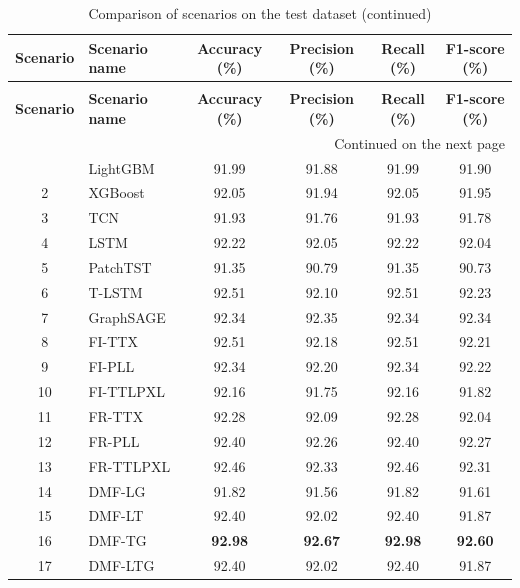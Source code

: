 \documentclass[10pt,twoside]{article}
\newcommand{\fairsmallfont}{\fontsize{9pt}{11pt}\selectfont}
\begin{document}
\begingroup
\centering
\setlength{\tabcolsep}{4pt}
\renewcommand{\arraystretch}{1.05}
\begin{longtable}{c l c c c c}
\caption{Comparison of scenarios on the test dataset}
\label{tab:test_scenarios_comparison}\\
\hline
\textbf{Scenario} & \textbf{Scenario name} & \textbf{Accuracy (\%)} & \textbf{Precision (\%)} & \textbf{Recall (\%)} & \textbf{F1-score (\%)} \\
\hline
\endfirsthead
\caption[]{Comparison of scenarios on the test dataset (continued)}\\
\hline
\textbf{Scenario} & \textbf{Scenario name} & \textbf{Accuracy (\%)} & \textbf{Precision (\%)} & \textbf{Recall (\%)} & \textbf{F1-score (\%)} \\
\hline
\endhead
\hline
\multicolumn{6}{r}{\fairsmallfont Continued on the next page}\\
\endfoot
\hline
\endlastfoot
1  & LightGBM   & 91.99 & 91.88 & 91.99 & 91.90 \\
2  & XGBoost    & 92.05 & 91.94 & 92.05 & 91.95 \\
3  & TCN        & 91.93 & 91.76 & 91.93 & 91.78 \\
4  & LSTM       & 92.22 & 92.05 & 92.22 & 92.04 \\
5  & PatchTST   & 91.35 & 90.79 & 91.35 & 90.73 \\
6  & T-LSTM     & 92.51 & 92.10 & 92.51 & 92.23 \\
7  & GraphSAGE  & 92.34 & 92.35 & 92.34 & 92.34 \\
8  & FI-TTX     & 92.51 & 92.18 & 92.51 & 92.21 \\
9  & FI-PLL     & 92.34 & 92.20 & 92.34 & 92.22 \\
10 & FI-TTLPXL  & 92.16 & 91.75 & 92.16 & 91.82 \\
11 & FR-TTX     & 92.28 & 92.09 & 92.28 & 92.04 \\
12 & FR-PLL     & 92.40 & 92.26 & 92.40 & 92.27 \\
13 & FR-TTLPXL  & 92.46 & 92.33 & 92.46 & 92.31 \\
14 & DMF-LG     & 91.82	& 91.56	& 91.82 & 91.61 \\
15 & DMF-LT     & 92.40	& 92.02	& 92.40	& 91.87 \\
16 & DMF-TG     & \textbf{92.98} & \textbf{92.67} & \textbf{92.98} & \textbf{92.60} \\
17 & DMF-LTG    & 92.40	& 92.02	& 92.40	& 91.87 \\

\end{longtable}
\end{document}
